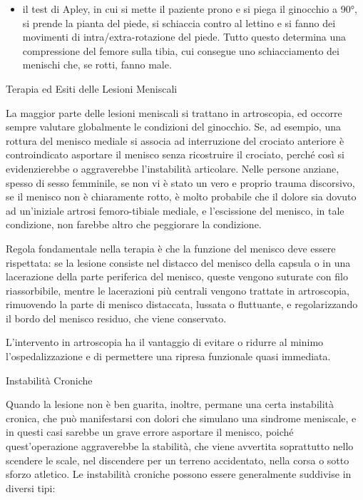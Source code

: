 \documentclass[]{article}
\begin{document}
\begin{itemize}
\item
  il test di Apley, in cui si mette il paziente prono e si piega il
  ginocchio a 90°, si prende la pianta del piede, si schiaccia contro al
  lettino e si fanno dei movimenti di intra/extra-rotazione del piede.
  Tutto questo determina una compressione del femore sulla tibia, cui
  consegue uno schiacciamento dei menischi che, se rotti, fanno male.
\end{itemize}

Terapia ed Esiti delle Lesioni Meniscali

La maggior parte delle lesioni meniscali si trattano in artroscopia, ed
occorre sempre valutare globalmente le condizioni del ginocchio. Se, ad
esempio, una rottura del menisco mediale si associa ad interruzione del
crociato anteriore è controindicato asportare il menisco senza
ricostruire il crociato, perché così si evidenzierebbe o aggraverebbe
l'instabilità articolare. Nelle persone anziane, spesso di sesso
femminile, se non vi è stato un vero e proprio trauma discorsivo, se il
menisco non è chiaramente rotto, è molto probabile che il dolore sia
dovuto ad un'iniziale artrosi femoro-tibiale mediale, e l'escissione del
menisco, in tale condizione, non farebbe altro che peggiorare la
condizione.

Regola fondamentale nella terapia è che la funzione del menisco deve
essere rispettata: se la lesione consiste nel distacco del menisco della
capsula o in una lacerazione della parte periferica del menisco, queste
vengono suturate con filo riassorbibile, mentre le lacerazioni più
centrali vengono trattate in artroscopia, rimuovendo la parte di menisco
distaccata, lussata o fluttuante, e regolarizzando il bordo del menisco
residuo, che viene conservato.

L'intervento in artroscopia ha il vantaggio di evitare o ridurre al
minimo l'ospedalizzazione e di permettere una ripresa funzionale quasi
immediata.

Instabilità Croniche

Quando la lesione non è ben guarita, inoltre, permane una certa
instabilità cronica, che può manifestarsi con dolori che simulano una
sindrome meniscale, e in questi casi sarebbe un grave errore asportare
il menisco, poiché quest'operazione aggraverebbe la stabilità, che viene
avvertita soprattutto nello scendere le scale, nel discendere per un
terreno accidentato, nella corsa o sotto sforzo atletico. Le instabilità
croniche possono essere generalmente suddivise in diversi tipi:
\end{document}
